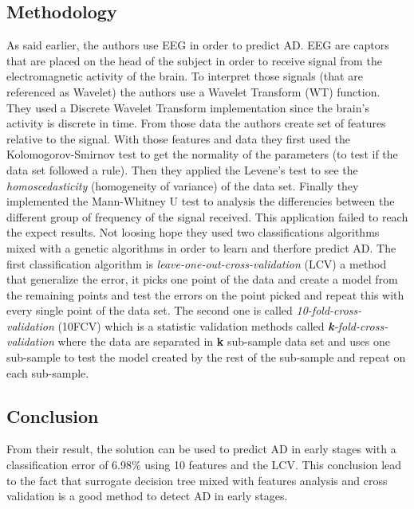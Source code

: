 \documentclass[a4paper, 12pt]{article}
\begin{document}
\subsection{Methodology} \label{met}
As said earlier, the authors use EEG in order to predict AD. EEG are captors that are placed on the head of the subject in order to receive signal from the electromagnetic activity of the brain. To interpret those signals (that are referenced as Wavelet) the authors use a Wavelet Transform (WT) function. They used a Discrete Wavelet Transform implementation since the brain's activity is discrete in time. From those data the authors create set of features relative to the signal. With those features and data they first used the Kolomogorov-Smirnov test to get the normality of the parameters (to test if the data set followed a rule). Then they applied the Levene's test to see the \textit{homoscedasticity} (homogeneity of variance)  of the data set. Finally they implemented the Mann-Whitney U test to analysis the differencies between the different group of frequency of the signal received. This application failed to reach the expect results. Not loosing hope they used two classifications algorithms mixed with a genetic algorithms in order to learn and therfore predict AD. The first classification algorithm is \textit{leave-one-out-cross-validation} (LCV) a method that generalize the error, it picks one point of the data and create a model from the remaining points and test the errors on the point picked and repeat this with every single point of the data set. The second one is called \textit{10-fold-cross-validation} (10FCV) which is a statistic validation methods called \textit{\textbf{k}-fold-cross-validation} where the data are separated in \textbf{k} sub-sample data set and uses one sub-sample to test the model created by the rest of the sub-sample and repeat on each sub-sample.
\subsection{Conclusion}
From their result, the solution can be used to predict AD in early stages with a classification error of 6.98\% using 10 features and the LCV. This conclusion lead to the fact that surrogate decision tree mixed with features analysis and cross validation is a good method to detect AD in early stages.
\end{document}
